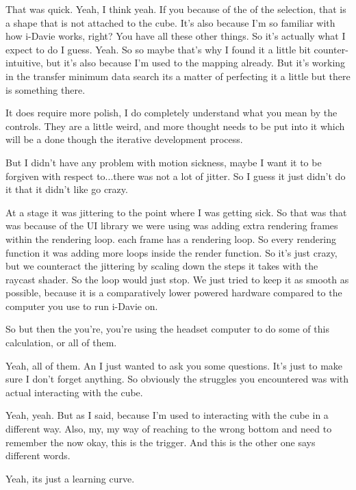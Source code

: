 \begin{description}
    \lucia That was quick. Yeah, I think yeah. If you because of the of the selection, that is a shape that is not attached to the cube. It's also because I'm so familiar with how i-Davie works, right? You have all these other things. So it's actually what I expect to do I guess. Yeah. So so maybe that's why I found it a little bit counter-intuitive, but it's also because I'm used to the mapping already. But it's working in the transfer minimum data search its a matter of perfecting it a little but there is something there.
    
    \mich It does require more polish, I do completely understand what you mean by the controls. They are a little weird, and more thought needs to be put into it which will be a done though the iterative development process.
    
    \lucia But I didn't have any problem with motion sickness, maybe I want it to be forgiven with respect to...there was not a lot of jitter. So I guess it just didn't do it that it didn't like go crazy.
    
    \mich At a stage it was jittering to the point where I was getting sick. So that was that was because of the UI library we were using was adding extra rendering frames within the rendering loop. each frame has a rendering loop. So every rendering function it was adding more loops inside the render function. So it's just crazy, but we counteract the jittering by scaling down the steps it takes with the raycast shader. So the loop would just stop. We just tried to keep it as smooth as possible, because it is a comparatively lower powered hardware compared to the computer you use to run i-Davie on.
    
    \lucia So but then the you're, you're using the headset computer to do some of this calculation, or all of them.
    
    \mich Yeah, all of them. An I just wanted to ask you some questions. It's just to make sure I don't forget anything. So obviously the struggles you encountered was with actual interacting with the cube.
    
    \lucia Yeah, yeah. But as I said, because I'm used to interacting with the cube in a different way. Also, my, my way of reaching to the wrong bottom and need to remember the now okay, this is the trigger. And this is the other one says different words. 
    
    \mich Yeah, its just a learning curve.
    

\end{description}
